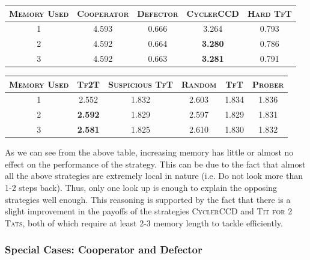 \documentclass[a4paper]{article}
\begin{document}
	\begin{table}[H]
	  \begin{center}
	    \begin{tabular}{|c|c|c|c|c|}
	      \toprule
		  \textsc{Memory Used} & \textsc{Cooperator} & \textsc{Defector} & {\footnotesize{\textsc{CyclerCCD}}} & \textsc{Hard TfT}\\
	      \midrule
		   1 & 	4.593 & 0.666 & 3.264 & 0.793\\
		   2 & 4.592 & 0.664 & \textbf{3.280} & 0.786\\
		   3 & 4.592 & 0.663 & \textbf{3.281} & 0.791\\
		   \bottomrule
	    \end{tabular}
	  \end{center}
	\end{table}  		

	\begin{table}[H]
	  \begin{center}
	    \begin{tabular}{|c|c|c|c|c|c|}
	      \toprule
	 	  \textsc{Memory Used} & \textsc{Tf2T} & {\footnotesize{\textsc{Suspicious TfT}}} & \textsc{Random} & \textsc{TfT} & \textsc{Prober}\\
	      \midrule
		  1	& 2.552 & 1.832 & 2.603 & 1.834 & 1.836\\
		  2 & \textbf{2.592} & 1.829 & 2.597 & 1.829 & 1.831\\
		  3 & \textbf{2.581} & 1.825 & 2.610 & 1.830 & 1.832\\
		\bottomrule
	    \end{tabular}
	  \end{center}
	\end{table}  		
	 
	As we can see from the above table, increasing memory has little or almost no effect on the performance of the strategy. This can be due to the fact that almost all the above strategies are extremely local in nature (i.e. Do not look more than 1-2 steps back). Thus, only one look up is enough to explain the opposing strategies well enough. This reasoning is supported by the fact that there is a slight improvement in the payoffs of the strategies  \textsc{CyclerCCD} and \textsc{Tit for 2 Tats}, both of which require at least 2-3 memory length to tackle efficiently.
	 
	\subsubsection{Special Cases: Cooperator and Defector}
\end{document}
